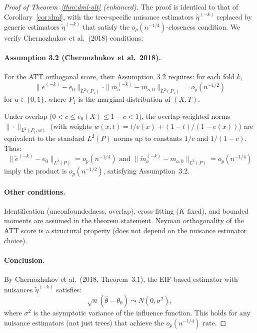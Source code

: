 \begin{proof}[Proof of Theorem~\ref{thm:dml-alt} (enhanced)]
The proof is identical to that of Corollary~\ref{cor:dml}, with the tree-specific nuisance estimators $\hat\eta^{(-k)}$ replaced by generic estimators $\tilde{\eta}^{(-k)}$ that satisfy the $o_p(n^{-1/4})$-closeness condition. We verify Chernozhukov et al.\ (2018) conditions:

\paragraph{Assumption 3.2 (Chernozhukov et al.\ 2018).}
For the ATT orthogonal score, their Assumption~3.2 requires: for each fold $k$,
\[
\|\tilde{e}^{(-k)} - e_0\|_{L^2(P_1)} \cdot \|\tilde{m}_a^{(-k)} - m_{a,0}\|_{L^2(P_1)} = o_p(n^{-1/2})
\]
for $a \in \{0, 1\}$, where $P_1$ is the marginal distribution of $(X, T)$.

Under overlap ($0 < c \le e_0(X) \le 1-c < 1$), the overlap-weighted norms $\|\cdot\|_{L^2(P_1, w)}$ (with weights $w(x,t) = t/e(x) + (1-t)/(1-e(x))$) are equivalent to the standard $L^2(P)$ norms up to constants $1/c$ and $1/(1-c)$. Thus:
\[
\|\tilde{e}^{(-k)} - e_0\|_{L^2(P)} = o_p(n^{-1/4}) \text{ and } \|\tilde{m}_a^{(-k)} - m_{a,0}\|_{L^2(P)} = o_p(n^{-1/4})
\]
imply the product is $o_p(n^{-1/2})$, satisfying Assumption~3.2.

\paragraph{Other conditions.}
Identification (unconfoundedness, overlap), cross-fitting ($K$ fixed), and bounded moments are assumed in the theorem statement. Neyman orthogonality of the ATT score is a structural property (does not depend on the nuisance estimator choice).

\paragraph{Conclusion.}
By Chernozhukov et al.\ (2018, Theorem~3.1), the EIF-based estimator with nuisances $\tilde{\eta}^{(-k)}$ satisfies:
\[
\sqrt{n}(\hat\theta - \theta_0) \leadsto N(0, \sigma^2),
\]
where $\sigma^2$ is the asymptotic variance of the influence function. This holds for any nuisance estimators (not just trees) that achieve the $o_p(n^{-1/4})$ rate.
\end{proof}



